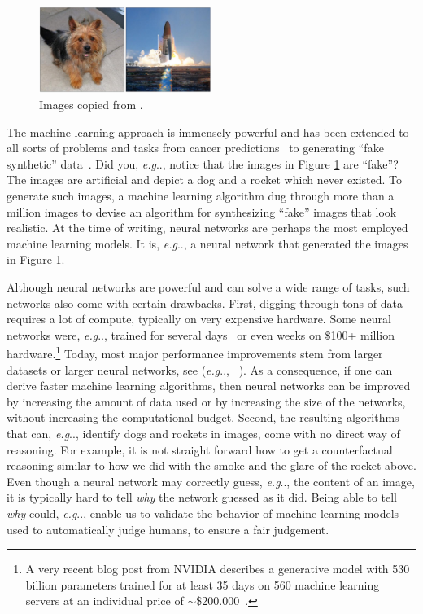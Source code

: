 \documentclass[11pt,a4paper,twoside,openright,final]{memoir}
\makeatletter
\DeclareRobustCommand\onedot{\futurelet\@let@token\@onedot}
\def\@onedot{\ifx\@let@token.\else.\null\fi\xspace}
\def\eg{\emph{e.g}\onedot} \def\Eg{\emph{E.g}\onedot}
\makeatother
\begin{document}
\begin{figure}
    \centering
    \includegraphics[width=0.5\textwidth]{graphics/biggan.png}
    \caption{Images copied from \cite{biggan}.}
    \label{fig:biggan-samples}
\end{figure}

The machine learning approach is immensely powerful and has been extended to all sorts of problems and tasks from cancer predictions~\cite{cancer} to generating ``fake synthetic'' data~\cite{biggan}. 
Did you, \eg, notice that the images in Figure \ref{fig:biggan-samples} are ``fake''? 
The images are artificial and depict a dog and a rocket which never existed.
To generate such images, a machine learning algorithm dug through more than a million images to devise an algorithm for synthesizing ``fake'' images that look realistic. 
At the time of writing, neural networks are perhaps the most employed machine learning models. 
It is, \eg, a neural network that generated the images in Figure \ref{fig:biggan-samples}. 

Although neural networks are powerful and can solve a wide range of tasks, such networks also come with certain drawbacks.
First, digging through tons of data requires a lot of compute, typically on very expensive hardware.
Some neural networks were, \eg, trained for several days~\cite{alexnet, alphafold} or even weeks on \$100+ million hardware.\footnote{A very recent blog post from NVIDIA describes a generative model with 530 billion parameters trained for at least 35 days on 560 machine learning servers at an individual price of $\sim$\$200.000~\cite{nvidia-bigass-mofo}.}
Today, most major performance improvements stem from larger datasets or larger neural networks, see (\eg, ~\cite{gpt-3}).
As a consequence, if one can derive faster machine learning algorithms, then neural networks can be improved by increasing the amount of data used or by increasing the size of the networks, without increasing the computational budget.
Second, the resulting algorithms that can, \eg, identify dogs and rockets in images, come with no direct way of reasoning. 
For example, it is not straight forward how to get a counterfactual reasoning similar to how we did with the smoke and the glare of the rocket above.
Even though a neural network may correctly guess, \eg, the content of an image, it is typically hard to tell \emph{why} the network guessed as it did.
Being able to tell \emph{why} could, \eg, enable us to validate the behavior of machine learning models used to automatically judge humans, to ensure a fair judgement.
\end{document}
